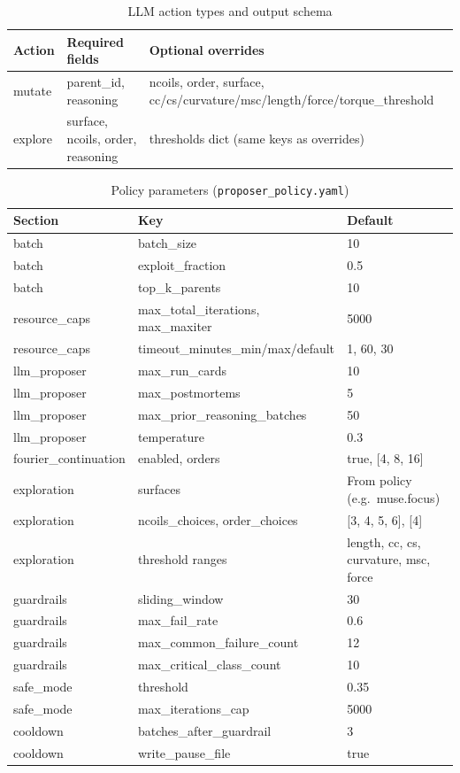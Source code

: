 \begin{table}[t]
  \centering
  \caption{LLM action types and output schema}
  \label{tab:actions}
  \begin{tabular}{@{}llp{5.5cm}@{}}
    \toprule
    \textbf{Action} & \textbf{Required fields} & \textbf{Optional overrides} \\
    \midrule
    mutate & parent\_id, reasoning & ncoils, order, surface, cc/cs/curvature/msc/length/force/torque\_threshold \\
    explore & surface, ncoils, order, reasoning & thresholds dict (same keys as overrides) \\
    \bottomrule
  \end{tabular}
\end{table}

\begin{table}[t]
  \centering
  \caption{Policy parameters (\texttt{proposer\_policy.yaml})}
  \label{tab:policy}
  \begin{tabular}{@{}lll@{}}
    \toprule
    \textbf{Section} & \textbf{Key} & \textbf{Default} \\
    \midrule
    batch & batch\_size & 10 \\
    batch & exploit\_fraction & 0.5 \\
    batch & top\_k\_parents & 10 \\
    \addlinespace
    resource\_caps & max\_total\_iterations, max\_maxiter & 5000 \\
    resource\_caps & timeout\_minutes\_min/max/default & 1, 60, 30 \\
    \addlinespace
    llm\_proposer & max\_run\_cards & 10 \\
    llm\_proposer & max\_postmortems & 5 \\
    llm\_proposer & max\_prior\_reasoning\_batches & 50 \\
    llm\_proposer & temperature & 0.3 \\
    \addlinespace
    fourier\_continuation & enabled, orders & true, [4, 8, 16] \\
    \addlinespace
    exploration & surfaces & From policy (e.g.\ muse.focus) \\
    exploration & ncoils\_choices, order\_choices & [3, 4, 5, 6], [4] \\
    exploration & threshold ranges & length, cc, cs, curvature, msc, force \\
    \addlinespace
    guardrails & sliding\_window & 30 \\
    guardrails & max\_fail\_rate & 0.6 \\
    guardrails & max\_common\_failure\_count & 12 \\
    guardrails & max\_critical\_class\_count & 10 \\
    \addlinespace
    safe\_mode & threshold & 0.35 \\
    safe\_mode & max\_iterations\_cap & 5000 \\
    \addlinespace
    cooldown & batches\_after\_guardrail & 3 \\
    cooldown & write\_pause\_file & true \\
    \bottomrule
  \end{tabular}
\end{table}

